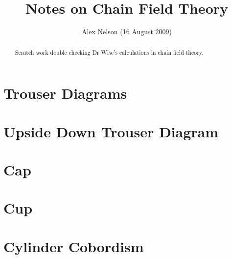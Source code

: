 \documentclass[final]{amsart}
\title{Notes on Chain Field Theory}
\author{Alex Nelson (16 August 2009)}
\numberwithin{equation}{section}
\begin{document}
\maketitle
\begin{abstract}
Scratch work double checking Dr Wise's calculations in chain
field theory.
\end{abstract}
\section{Trouser Diagrams}


\section{Upside Down Trouser Diagram}

\pagebreak
\section{Cap}


\section{Cup}


\pagebreak
\section{Cylinder Cobordism}


\nocite{*}


\end{document}
